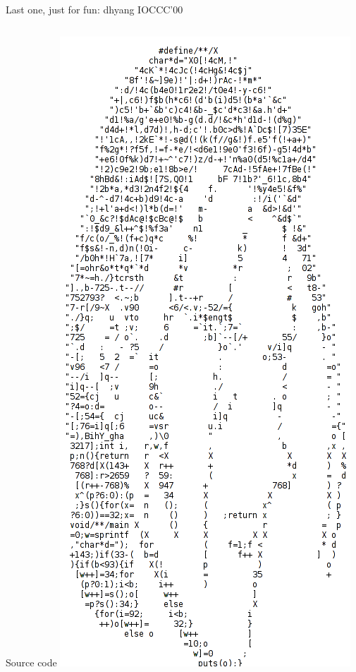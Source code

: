 \begin{frame}[t]{Last one, just for fun: dhyang IOCCC'00}
  \begin{columns}
    \begin{column}{.25\linewidth}\vspace{-\baselineskip}
      \begin{block}{Source code}\medskip
        \includegraphics[width=\linewidth]{img/dhyang1.png}        
      \end{block}
    \end{column}


\end{columns}
\end{frame}
